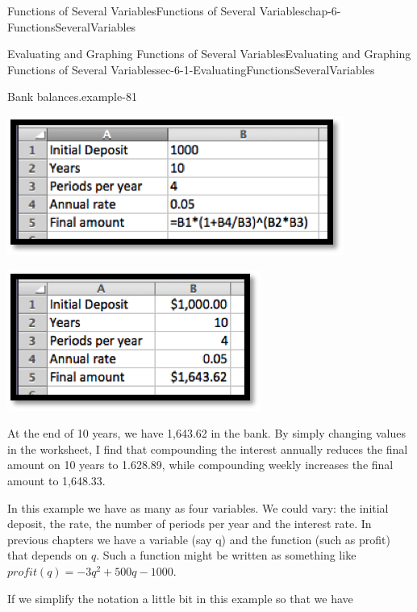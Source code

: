 \documentclass[oneside,10pt,]{book}
\numberwithin{equation}{section}
\begin{document}
\begin{chapterptx}{Functions of Several Variables}{}{Functions of Several Variables}{}{}{chap-6-FunctionsSeveralVariables}
\begin{sectionptx}{Evaluating and Graphing Functions of Several Variables}{}{Evaluating and Graphing Functions of Several Variables}{}{}{sec-6-1-EvaluatingFunctionsSeveralVariables}
\begin{example}{Bank balances.}{example-81}
\begin{sidebyside}{1}{0.3}{0.3}{0}
\begin{sbspanel}{0.4}
\includegraphics[width=1\linewidth]{images/sec-6-1-1.png}
\end{sbspanel}%
\end{sidebyside}%
\begin{sidebyside}{1}{0.3}{0.3}{0}%
\begin{sbspanel}{0.4}%
\includegraphics[width=1\linewidth]{images/sec-6-1-2.png}
\end{sbspanel}%
\end{sidebyside}%
\par
\hypertarget{p-2115}{}%
At the end of 10 years, we have \textdollar{}1,643.62 in the bank.  By simply changing values in the worksheet, I find that compounding the interest annually reduces the final amount on 10 years to \textdollar{}1.628.89, while compounding weekly increases the final amount to \textdollar{}1,648.33.%
\end{example}
\hypertarget{p-2116}{}%
In this example we have as many as four variables. We could vary: the initial deposit, the rate, the number of periods per year and the interest rate. In previous chapters we have a variable (say q) and the function (such as profit) that depends on \(q\). Such a function might be written as something like \(profit(q)= -3 q^2+500q-1000\).%
\par
\hypertarget{p-2117}{}%
If we simplify the notation a little bit in this example so that we have%

\end{sectionptx}
\end{chapterptx}
\end{document}
